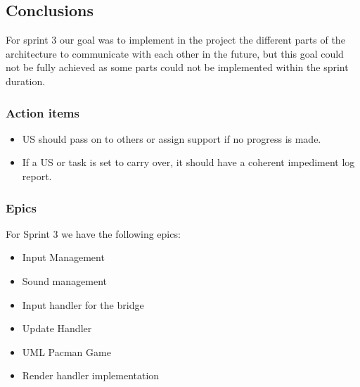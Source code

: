 \subsection{Conclusions}

For sprint 3 our goal was to implement in the project the different parts of the architecture to communicate with each other in the future, but this goal could not be fully achieved as some parts could not be implemented within the sprint duration.

\subsubsection{Action items}

\begin{itemize}
    \item US should pass on to others or assign support if no progress is made.
    \item If a US or task is set to carry over, it should have a coherent impediment log report.
\end{itemize}

\subsubsection{Epics}

For Sprint 3 we have the following epics:

\begin{itemize}
    \item Input Management
    \item Sound management
    \item Input handler for the bridge
    \item Update Handler
    \item UML Pacman Game
    \item Render handler implementation 
\end{itemize}
